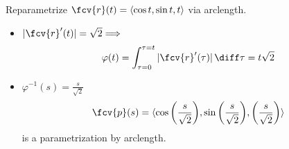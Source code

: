 \begin{frame}
\begin{example}
Reparametrize $\fcv{r}(t) = \langle \cos{t}, \sin{t}, t\rangle$ via arclength.

\begin{itemize}
\item<2-> $|\fcv{r}'(t)| = \sqrt{2} \Longrightarrow $
$$\varphi(t) = \int_{\tau=0}^{\tau=t}|\fcv{r}'(\tau)|\, \diff\tau =  t\sqrt{2}$$
\item<3-> $\varphi^{-1}(s) = \frac{s}{\sqrt{2}}$
\[
\fcv{p}(s) = \langle \cos{\left( \frac{s}{\sqrt{2}} \right)}, \sin{\left( \frac{s}{\sqrt{2}} \right)}, \left( \frac{s}{\sqrt{2}} \right) \rangle
\]
is a parametrization by arclength.
\end{itemize}
\end{example}
\end{frame}